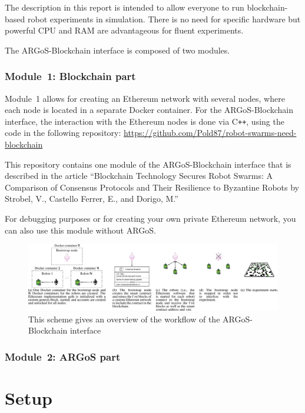 \documentclass{article}
\begin{document}
The description in this report is intended to allow everyone to run
blockchain-based robot experiments in simulation. There is no need for
specific hardware but powerful CPU and RAM are advantageous for fluent
experiments.

The ARGoS-Blockchain interface is composed of two modules. 

\subsubsection{Module~1: Blockchain part}
Module~1 allows for creating an Ethereum network with several nodes,
where each node is located in a separate Docker container. For the
ARGoS-Blockchain interface, the interaction with the Ethereum nodes is
done via C\texttt{++}, using the code in the following repository:
\url{https://github.com/Pold87/robot-swarms-need-blockchain}

This repository contains one module of the ARGoS-Blockchain interface
that is described in the article ``Blockchain Technology Secures Robot
Swarms: A Comparison of Consensus Protocols and Their Resilience to
Byzantine Robots by Strobel, V., Castello Ferrer, E., and Dorigo, M.''

For debugging purposes or for creating your own private Ethereum
network, you can also use this module without ARGoS.

\begin{figure}[t]
  \centering
  \includegraphics{interface}
  \caption[Overview of the ARGoS-Blockchain interface]{This scheme
    gives an overview of the workflow of the ARGoS-Blockchain
    interface}
  \label{fig:interface}
\end{figure}

\subsubsection{Module~2: ARGoS part}

\section{Setup}
\end{document}
